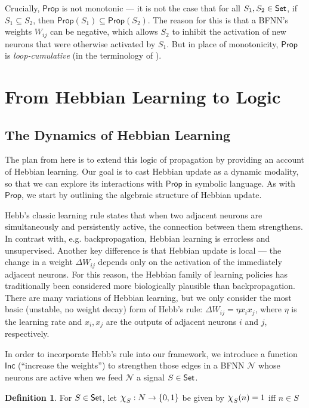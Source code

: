 \documentclass[letterpaper]{article}
\newcommand{\Set}{\mbox{\sf Set}}
\theoremstyle{definition}
\newtheorem{definition}{Definition}
\newcommand{\set}[1]{\{ #1 \}}
\newcommand{\Prop}{\textsf{Prop}}
\newcommand{\Inc}{\textsf{Inc}}
\newcommand{\Net}{\mathcal{N}}
\newcommand*{\bigchi}{\mbox{\Large$\chi$}}%
\begin{document}
Crucially, $\Prop$ is not monotonic --- it is not the case that for all $S_1, S_2 \in \Set$, if $S_1 \subseteq S_2$, then $\Prop(S_1) \subseteq \Prop(S_2)$.  The reason for this is that a BFNN's weights $W_{ij}$ can be negative, which allows $S_2$ to inhibit the activation of new neurons that were otherwise activated by $S_1$.  But in place of monotonicity, $\Prop$ is \emph{loop-cumulative} (in the terminology of \cite{kraus1990nonmonotonic}).

\section{From Hebbian Learning to Logic}

\subsection{The Dynamics of Hebbian Learning}

The plan from here is to extend this logic of propagation by providing an account of Hebbian learning.  Our goal is to cast Hebbian update as a dynamic modality, so that we can explore its interactions with $\Prop$ in symbolic language.  As with $\Prop$, we start by outlining the algebraic structure of Hebbian update.

Hebb's classic learning rule \cite{hebb-organization-of-behavior-1949} states that when two adjacent neurons are simultaneously and persistently active, the connection between them strengthens.  In contrast with, e.g. backpropagation, Hebbian learning is errorless and unsupervised.  Another key difference is that Hebbian update is local --- the change in a weight $\Delta W_{ij}$ depends only on the activation of the immediately adjacent neurons.  For this reason, the Hebbian family of learning policies has traditionally been considered more biologically plausible than backpropagation.  There are many variations of Hebbian learning, but we only consider the most basic (unstable, no weight decay) form of Hebb's rule:  $\Delta W_{ij} = \eta x_i x_j$, where $\eta$ is the learning rate and $x_i, x_j$ are the outputs of adjacent neurons $i$ and $j$, respectively.

In order to incorporate Hebb's rule into our framework, we introduce a function $\Inc$ (``increase the weights'') to strengthen those edges in a BFNN $\Net$ whose neurons are active when we feed $\Net$ a signal $S \in \Set$.  
\begin{definition}
For $S \in \Set$, let 
$\bigchi_S : N \to \set{0, 1}$ be given by $\bigchi_S(n) = 1$ iff $n \in S$
\end{definition}
\end{document}
